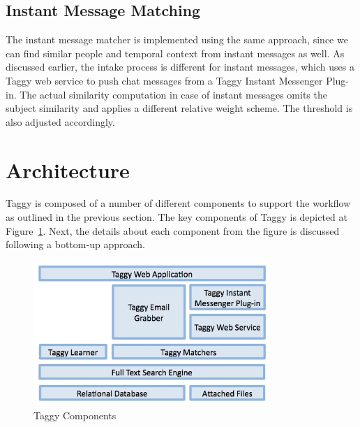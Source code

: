 \subsection{Instant Message Matching}
The instant message matcher is implemented using the same approach, since we can find similar people and temporal context from instant messages as well. As discussed earlier, the intake process is different for instant messages, which uses a Taggy web service to push chat messages from a Taggy Instant Messenger Plug-in. The actual similarity computation in case of instant messages omits the subject similarity and applies a different relative weight scheme. The threshold is also adjusted accordingly.

\section{Architecture}
Taggy is composed of a number of different components to support the workflow as outlined in the previous section. The key components of Taggy is depicted at Figure~\ref{fig:architecture}. Next, the details about each component from the figure is discussed following a bottom-up approach.

\begin{figure}[!h]
	\centering
	\includegraphics[width=0.8\textwidth]{architecture.png}
    \caption{Taggy Components}
	\label{fig:architecture}
\end{figure}

